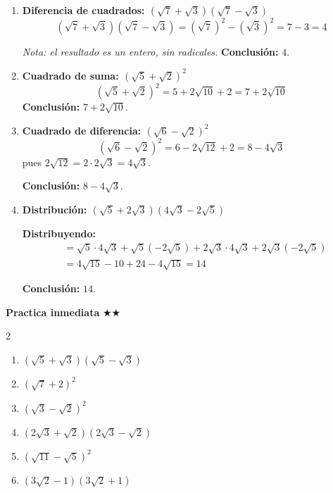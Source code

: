 \documentclass[11pt, letterpaper]{article}
\begin{document}
\begin{tcolorbox}[examplebox, title={Ejemplos — productos notables}]
\begin{enumerate}[label=\textbf{Ej. \arabic*.}, leftmargin=*, itemsep=14pt]

\item \textbf{Diferencia de cuadrados: $(\sqrt{7}+\sqrt{3})(\sqrt{7}-\sqrt{3})$}
$$(\sqrt{7}+\sqrt{3})(\sqrt{7}-\sqrt{3})=(\sqrt{7})^2-(\sqrt{3})^2=7-3=4$$

\textit{Nota: el resultado es un entero, sin radicales.}
\textbf{Conclusión:} $4$.

\item \textbf{Cuadrado de suma: $(\sqrt{5}+\sqrt{2})^2$}
$$(\sqrt{5}+\sqrt{2})^2=5+2\sqrt{10}+2=7+2\sqrt{10}$$
\textbf{Conclusión:} $7+2\sqrt{10}$.

\item \textbf{Cuadrado de diferencia: $(\sqrt{6}-\sqrt{2})^2$}
$$(\sqrt{6}-\sqrt{2})^2=6-2\sqrt{12}+2=8-4\sqrt{3}$$
pues $2\sqrt{12}=2\cdot 2\sqrt{3}=4\sqrt{3}$.

\textbf{Conclusión:} $8-4\sqrt{3}$.

\item \textbf{Distribución: $(\sqrt{5}+2\sqrt{3})(4\sqrt{3}-2\sqrt{5})$}

\textbf{Distribuyendo:}
\begin{align*}
&=\sqrt{5}\cdot 4\sqrt{3}+\sqrt{5}(-2\sqrt{5})+2\sqrt{3}\cdot 4\sqrt{3}+2\sqrt{3}(-2\sqrt{5})\\
&=4\sqrt{15}-10+24-4\sqrt{15}=14
\end{align*}

\textbf{Conclusión:} $14$.

\end{enumerate}
\end{tcolorbox}

\medskip
\textbf{Practica inmediata} \quad $\bigstar\bigstar$
\begin{multicols}{2}
\begin{enumerate}[label=\alph*), leftmargin=*]
  \item $(\sqrt{5}+\sqrt{3})(\sqrt{5}-\sqrt{3})$
  \item $(\sqrt{7}+2)^2$
  \item $(\sqrt{3}-\sqrt{2})^2$
  \item $(2\sqrt{3}+\sqrt{2})(2\sqrt{3}-\sqrt{2})$
  \item $(\sqrt{11}-\sqrt{5})^2$
  \item $(3\sqrt{2}-1)(3\sqrt{2}+1)$
\end{enumerate}
\end{multicols}
\end{document}
